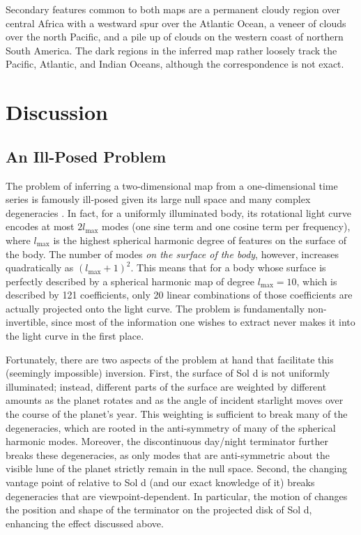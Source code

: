 \documentclass[modern]{aastex62}
\begin{document}
Secondary features common to both maps are a permanent cloudy region over
central Africa with a westward spur over the Atlantic Ocean, a veneer of clouds
over the north Pacific, and a pile up of clouds on the western coast of
northern South America. The dark regions in the inferred map rather loosely
track the Pacific, Atlantic, and Indian Oceans, although the correspondence
is not exact.

\section{Discussion}
\label{sec:discussion}

\subsection{An Ill-Posed Problem}
\label{sec:illposed}

The problem of inferring a two-dimensional map from a one-dimensional
time series is famously ill-posed given its large null space and many complex
degeneracies \citep[e.g.,][]{CowanFuentesHaggard2013}. In fact, for a 
uniformly illuminated body, its rotational light curve encodes at most
$2l_\mathrm{max}$ modes (one sine term and one cosine term per frequency), 
where $l_\mathrm{max}$ is the highest spherical
harmonic degree of features on the surface of the body. The number of modes
\emph{on the surface of the body}, however, increases quadratically 
as $(l_\mathrm{max} + 1)^2$. This means that for a body whose surface is
perfectly described by a spherical harmonic map of degree $l_\mathrm{max} = 10$,
which is described by 121 coefficients, only 20 linear combinations
of those coefficients are actually projected onto the light curve. The
problem is fundamentally non-invertible, since most of the information
one wishes to extract never makes it into the light curve in the first place.

Fortunately, there are two aspects of the problem at hand that facilitate
this (seemingly impossible) inversion. First, the surface of Sol d is
not uniformly illuminated; instead, different parts of the surface are weighted
by different amounts as the planet rotates and as the angle of incident starlight
moves over the course of the planet's year. This weighting is sufficient to break many
of the degeneracies, which are rooted in the anti-symmetry of many of the spherical
harmonic modes. Moreover, the discontinuous day/night terminator further
breaks these degeneracies, as only modes that are anti-symmetric about
the visible lune of the planet strictly remain in the null space. Second, 
the changing vantage point of \TESS relative to Sol d (and our exact knowledge of it)
breaks degeneracies that are viewpoint-dependent. In particular, the motion of
\TESS changes the position and shape of the terminator on the projected disk
of Sol d, enhancing the effect discussed above.
\end{document}
